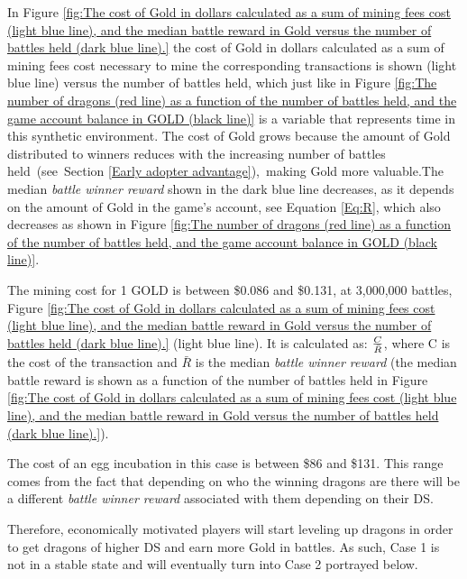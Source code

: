 \documentclass[12pt]{article}
\begin{document}
{%


In Figure \ref{fig:The cost of Gold in dollars calculated as a sum of mining fees cost (light blue line), and the median battle reward in Gold versus the number of battles held (dark blue line).} the cost of Gold in dollars calculated as a sum of mining fees cost necessary to mine the corresponding transactions is shown (light blue line) versus the number of battles held, which just like in Figure \ref{fig:The number of dragons (red line) as a function of the number of battles held, and the game account balance in GOLD (black line)} is a variable that represents time in this synthetic environment. The cost of Gold grows because the amount of Gold distributed to winners reduces with the increasing number of battles held\ (see\ Section   \ref{Early adopter advantage}),\ making Gold more valuable.The median {\it battle winner reward} shown in the dark blue line decreases, as it depends on the amount of Gold in the game’s account, see Equation  \ref{Eq:R}, which also decreases as shown in Figure \ref{fig:The number of dragons (red line) as a function of the number of battles held, and the game account balance in GOLD (black line)}.\par

The mining cost for 1 GOLD is between \$0.086 and \$0.131, at 3,000,000 battles, Figure \ref{fig:The cost of Gold in dollars calculated as a sum of mining fees cost (light blue line), and the median battle reward in Gold versus the number of battles held (dark blue line).} (light blue line).  It is calculated as:  ${{C}\over{\bar R}}$, where C is the cost of the transaction and  $\bar R$ is the median \textit{battle winner reward} (the median battle reward is shown as a function of the number of battles held in Figure \ref{fig:The cost of Gold in dollars calculated as a sum of mining fees cost (light blue line), and the median battle reward in Gold versus the number of battles held (dark blue line).}).\par

The cost of an egg incubation in this case is between \$86 and \$131. This range comes from the fact that depending on who the winning dragons are there will be a different \textit{battle winner reward} associated with them depending on their DS.\par

Therefore, economically motivated players will start leveling up dragons in order to get dragons of higher DS and earn more Gold in battles. As such, Case 1 is not in a stable state and will eventually turn into Case 2 portrayed below.\par


}
\end{document}
